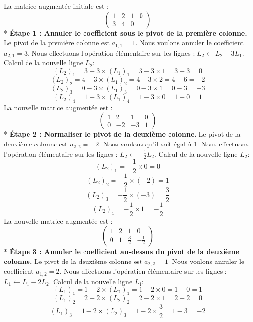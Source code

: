 \documentclass[12pt,a4paper]{report}
\begin{document}
        La matrice augmentée initiale est :
        $$\left( \begin{array}{cc|cc} 1 & 2 & 1 & 0 \\ 3 & 4 & 0 & 1 \end{array} \right)$$
        *   \textbf{Étape 1 : Annuler le coefficient sous le pivot de la première colonne.}
            Le pivot de la première colonne est $a_{1,1}=1$. Nous voulons annuler le coefficient $a_{2,1}=3$.
            Nous effectuons l'opération élémentaire sur les lignes : $L_2 \leftarrow L_2 - 3L_1$.
            Calcul de la nouvelle ligne $L_2$:
            $$(L_2)_{1} = 3 - 3 \times (L_1)_{1} = 3 - 3 \times 1 = 3 - 3 = 0$$
            $$(L_2)_{2} = 4 - 3 \times (L_1)_{2} = 4 - 3 \times 2 = 4 - 6 = -2$$
            $$(L_2)_{3} = 0 - 3 \times (L_1)_{3} = 0 - 3 \times 1 = 0 - 3 = -3$$
            $$(L_2)_{4} = 1 - 3 \times (L_1)_{4} = 1 - 3 \times 0 = 1 - 0 = 1$$
            La nouvelle matrice augmentée est :
            $$\left( \begin{array}{cc|cc} 1 & 2 & 1 & 0 \\ 0 & -2 & -3 & 1 \end{array} \right)$$
        *   \textbf{Étape 2 : Normaliser le pivot de la deuxième colonne.}
            Le pivot de la deuxième colonne est $a_{2,2}=-2$. Nous voulons qu'il soit égal à 1.
            Nous effectuons l'opération élémentaire sur les lignes : $L_2 \leftarrow -\frac{1}{2} L_2$.
            Calcul de la nouvelle ligne $L_2$:
            $$(L_2)_{1} = -\frac{1}{2} \times 0 = 0$$
            $$(L_2)_{2} = -\frac{1}{2} \times (-2) = 1$$
            $$(L_2)_{3} = -\frac{1}{2} \times (-3) = \frac{3}{2}$$
            $$(L_2)_{4} = -\frac{1}{2} \times 1 = -\frac{1}{2}$$
            La nouvelle matrice augmentée est :
            $$\left( \begin{array}{cc|cc} 1 & 2 & 1 & 0 \\ 0 & 1 & \frac{3}{2} & -\frac{1}{2} \end{array} \right)$$
        *   \textbf{Étape 3 : Annuler le coefficient au-dessus du pivot de la deuxième colonne.}
            Le pivot de la deuxième colonne est $a_{2,2}=1$. Nous voulons annuler le coefficient $a_{1,2}=2$.
            Nous effectuons l'opération élémentaire sur les lignes : $L_1 \leftarrow L_1 - 2L_2$.
            Calcul de la nouvelle ligne $L_1$:
            $$(L_1)_{1} = 1 - 2 \times (L_2)_{1} = 1 - 2 \times 0 = 1 - 0 = 1$$
            $$(L_1)_{2} = 2 - 2 \times (L_2)_{2} = 2 - 2 \times 1 = 2 - 2 = 0$$
            $$(L_1)_{3} = 1 - 2 \times (L_2)_{3} = 1 - 2 \times \frac{3}{2} = 1 - 3 = -2$$
\end{document}
